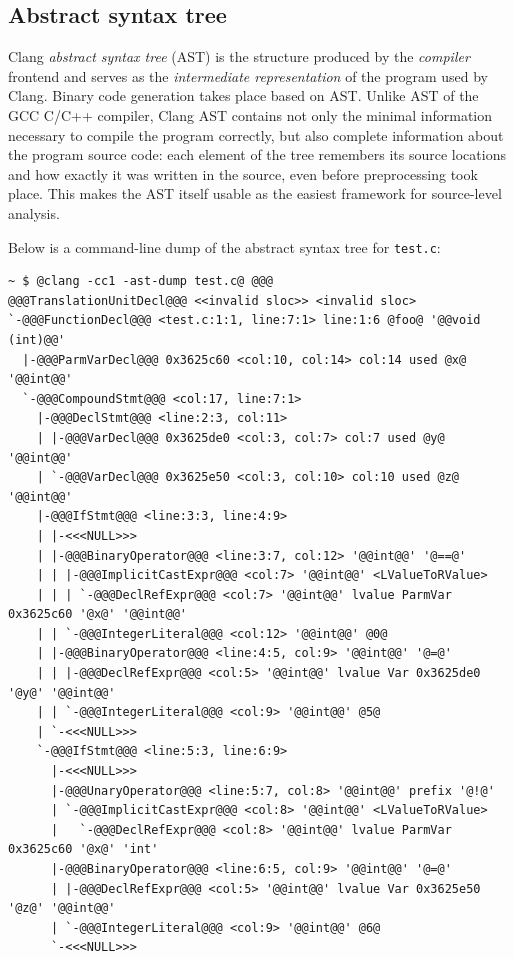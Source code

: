 \documentclass[a4paper,12pt]{article}
\newenvironment{nobr}{\begin{minipage}{\textwidth}\setlength\parskip{1em}
}{\end{minipage}\ignorespacesafterend}
\begin{document}
\subsection{Abstract syntax tree}

Clang \emph{abstract syntax tree} (AST) is the structure produced by the \emph{compiler} frontend and serves as the \emph{intermediate representation} of the program used by Clang. Binary code generation takes place based on AST. Unlike AST of the GCC C/C++ compiler, Clang AST contains not only the minimal information necessary to compile the program correctly, but also complete information about the program source code: each element of the tree remembers its source locations and how exactly it was written in the source, even before preprocessing took place. This makes the AST itself usable as the easiest framework for source-level analysis.

Below is a command-line dump of the abstract syntax tree for \lstinline|test.c|:

\begin{nobr}
\begin{lstlisting}[style=commandline]
~ $ @clang -cc1 -ast-dump test.c@ @@@
@@@TranslationUnitDecl@@@ <<invalid sloc>> <invalid sloc>
`-@@@FunctionDecl@@@ <test.c:1:1, line:7:1> line:1:6 @foo@ '@@void (int)@@'
  |-@@@ParmVarDecl@@@ 0x3625c60 <col:10, col:14> col:14 used @x@ '@@int@@'
  `-@@@CompoundStmt@@@ <col:17, line:7:1>
    |-@@@DeclStmt@@@ <line:2:3, col:11>
    | |-@@@VarDecl@@@ 0x3625de0 <col:3, col:7> col:7 used @y@ '@@int@@'
    | `-@@@VarDecl@@@ 0x3625e50 <col:3, col:10> col:10 used @z@ '@@int@@'
    |-@@@IfStmt@@@ <line:3:3, line:4:9>
    | |-<<<NULL>>>
    | |-@@@BinaryOperator@@@ <line:3:7, col:12> '@@int@@' '@==@'
    | | |-@@@ImplicitCastExpr@@@ <col:7> '@@int@@' <LValueToRValue>
    | | | `-@@@DeclRefExpr@@@ <col:7> '@@int@@' lvalue ParmVar 0x3625c60 '@x@' '@@int@@'
    | | `-@@@IntegerLiteral@@@ <col:12> '@@int@@' @0@
    | |-@@@BinaryOperator@@@ <line:4:5, col:9> '@@int@@' '@=@'
    | | |-@@@DeclRefExpr@@@ <col:5> '@@int@@' lvalue Var 0x3625de0 '@y@' '@@int@@'
    | | `-@@@IntegerLiteral@@@ <col:9> '@@int@@' @5@
    | `-<<<NULL>>>
    `-@@@IfStmt@@@ <line:5:3, line:6:9>
      |-<<<NULL>>>
      |-@@@UnaryOperator@@@ <line:5:7, col:8> '@@int@@' prefix '@!@'
      | `-@@@ImplicitCastExpr@@@ <col:8> '@@int@@' <LValueToRValue>
      |   `-@@@DeclRefExpr@@@ <col:8> '@@int@@' lvalue ParmVar 0x3625c60 '@x@' 'int'
      |-@@@BinaryOperator@@@ <line:6:5, col:9> '@@int@@' '@=@'
      | |-@@@DeclRefExpr@@@ <col:5> '@@int@@' lvalue Var 0x3625e50 '@z@' '@@int@@'
      | `-@@@IntegerLiteral@@@ <col:9> '@@int@@' @6@
      `-<<<NULL>>>
\end{lstlisting}
\end{nobr}
\end{document}
